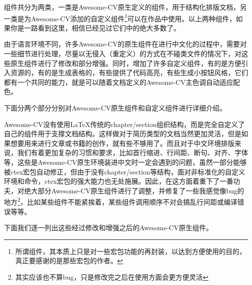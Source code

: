组件共分为两类，一类是Awesome-CV原生定义的组件，用于结构化排版文档，另一类是{\dk}为Awesome-CV添加的自定义组件\footnote{所谓组件，其本质上只是对一些宏包功能的再封装，以达到方便使用的目的，真正要感谢的是那些宏包的作者。}可以在作品中使用。以上两种组件，如果你是一路看到这里，相信已经见过它们中的绝大多数了。

由于语言环境不同，许多Awesome-CV的原生组件在进行中文化的过程中，需要对一些细节进行处理，{\dk}尽量以无侵入（重定义）的方式在不碰类文件的情况下，对这些原生组件进行了修改和部分增强。同时，{\dk}增加了许多自定义组件，有的是方便引入资源的，有的是生成表格的，有些提供了代码高亮，有些生成小按钮风格，它们都有一个共同的能力，就是可以随着文档定义的Awesome-CV主色调自动适应配色。

下面分两个部分分别对Awesome-CV原生组件和{\dk}自定义组件进行详细介绍。

Awesome-CV没有使用{\LaTeX}传统的chapter/section组织结构，而是完全自定义了自己的组件用于支撑文档结构。这样做对于简历类型的文档当然更加灵活，但是如果想要用来进行文章或书籍的创作，就有些不够用了。而且对于中文环境排版来说，我们有着更加复杂的习惯和要求，比如首行缩进、行间距、断句、对齐、字体等，这些是Awesome-CV原生环境装进中文时一定会遇到的问题，虽然一部分能够被ctex宏包自动修正，但由于没有chapter/section等结构，面对非标准化的自定义环境和命令，ctex宏包的强大能力也无处施展。因此，{\dk}在这方面着重下了一番功夫，对绝大部分Awesome-CV原生组件进行了调整，并修复了一些我感觉像bug的地方\footnote{其实应该也不算bug，只是修改完之后在使用方面会更方便灵活}，比如某些组件不能紧挨着，某些组件调用顺序不对会搞乱行间距或编译错误等等。

下面我们逐一列出这些经过修改和增强之后的Awesome-CV原生组件。

